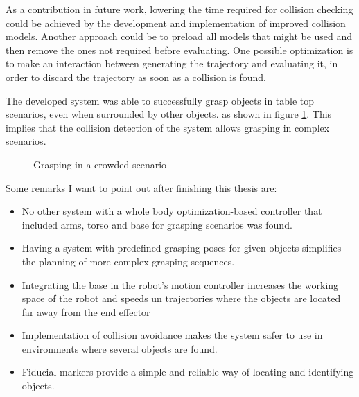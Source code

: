As a contribution in future work, lowering the time required for collision checking could be achieved by the development and implementation of improved collision models. Another approach could be to preload all models that might be used and then remove the ones not required before evaluating. One possible optimization is to make an interaction between generating the trajectory and evaluating it, in order to discard the trajectory as soon as a collision is found.

The developed system was able to successfully grasp objects in table top scenarios, even when surrounded by other objects. as shown in figure \ref{fig:gres}. This implies that the collision detection of the system allows grasping in complex scenarios.
\begin{figure}[H]
	\centering
	\begin{subfigure}
		{\texttt{[image: results/grasp\_crowded.jpg]}}
	\end{subfigure}
	\begin{subfigure}
		{\texttt{[image: results/grasp\_c3.jpg]}}
	\end{subfigure}
	\vspace{-15pt}
	\caption[Complex Grasping]{Grasping in a crowded scenario}
	\vspace{-10pt}
	\label{fig:gres}
\end{figure}

Some remarks I want to point out after finishing this thesis are:
\begin{itemize}
	\item No other system with a whole body optimization-based controller that included arms, torso and base for grasping scenarios was found.
	\item Having a system with predefined grasping poses for given objects simplifies the planning of more complex grasping sequences.
	\item Integrating the base in the robot's motion controller increases the working space of the robot and speeds un trajectories where the objects are located far away from the end effector
	\item Implementation of collision avoidance makes the system safer to use in environments where several objects are found.
	\item Fiducial markers provide a simple and reliable way of locating and identifying objects.
\end{itemize}

